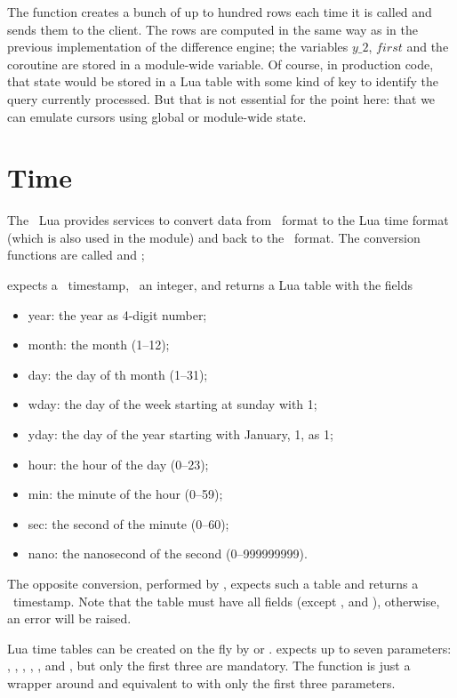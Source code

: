 The function creates a bunch of
up to hundred rows each time it is called
and sends them to the client.
The rows are computed in the same way
as in the previous implementation of
the difference engine;
the variables $y\_2$, $first$ and
the coroutine  are stored
in a module-wide variable.
Of course, in production code,
that state would be stored
in a Lua table with some kind
of key to identify the query
currently processed. But that
is not essential for the point
here: that we can emulate cursors
using global or module-wide state.

\section{Time}
The \nowdb\ Lua 
provides services to convert
data from \nowdb\ format to
the Lua time format (which is also
used in the  module)
and back to the \nowdb\ format.
The conversion functions are
called  and ;

 expects a \nowdb\ timestamp,
\ie\ an integer, and returns a Lua table with
the fields

\begin{itemize}
\item year: the year as 4-digit number;
\item month: the month (1--12);
\item day: the day of th month (1--31);
\item wday: the day of the week starting at sunday with 1;
\item yday: the day of the year starting with January, 1, as 1;
\item hour: the hour of the day (0--23);
\item min: the minute of the hour (0--59);
\item sec: the second of the minute (0--60);
\item nano: the nanosecond of the second (0--999999999).
\end{itemize}

The opposite conversion, performed by , expects
such a table and returns a \nowdb\ timestamp.
Note that the table must have all fields
(except ,  and ), otherwise,
an error will be raised.

Lua time tables can be created on the fly
by  or .
 expects up to seven parameters:
, , ,
, , 
and , but only the first three
are mandatory. The  function
is just a wrapper around  and
equivalent to  with only
the first three parameters.

